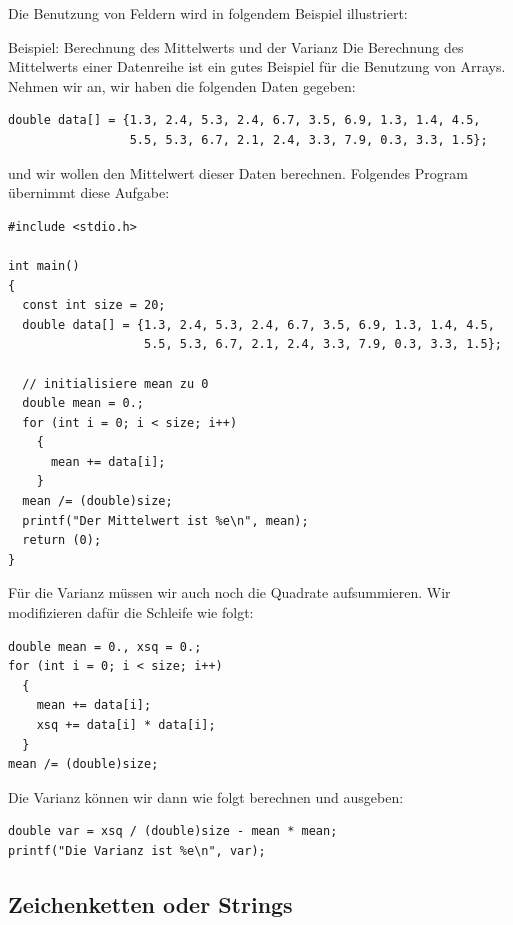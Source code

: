 Die Benutzung von Feldern wird in folgendem Beispiel illustriert:
\begin{myexampleprogram}{Beispiel: Berechnung des Mittelwerts und der Varianz}
  Die Berechnung des Mittelwerts einer Datenreihe ist ein gutes Beispiel für die Benutzung von Arrays.
  Nehmen wir an, wir haben die folgenden Daten gegeben:
\begin{lstlisting}
double data[] = {1.3, 2.4, 5.3, 2.4, 6.7, 3.5, 6.9, 1.3, 1.4, 4.5,
                 5.5, 5.3, 6.7, 2.1, 2.4, 3.3, 7.9, 0.3, 3.3, 1.5};
\end{lstlisting}
  und wir wollen den Mittelwert dieser Daten berechnen.
  Folgendes Program übernimmt diese Aufgabe:
\begin{lstlisting}
#include <stdio.h>

int main()
{
  const int size = 20;
  double data[] = {1.3, 2.4, 5.3, 2.4, 6.7, 3.5, 6.9, 1.3, 1.4, 4.5,
                   5.5, 5.3, 6.7, 2.1, 2.4, 3.3, 7.9, 0.3, 3.3, 1.5};

  // initialisiere mean zu 0
  double mean = 0.;
  for (int i = 0; i < size; i++)
    {
      mean += data[i];
    }
  mean /= (double)size;
  printf("Der Mittelwert ist %e\n", mean);
  return (0);
}
\end{lstlisting}
  Für die Varianz müssen wir auch noch die Quadrate aufsummieren.
  Wir modifizieren dafür die Schleife wie folgt:
\begin{lstlisting}
double mean = 0., xsq = 0.;
for (int i = 0; i < size; i++)
  {
    mean += data[i];
    xsq += data[i] * data[i];
  }
mean /= (double)size;
\end{lstlisting}
  Die Varianz können wir dann wie folgt berechnen und ausgeben:
\begin{lstlisting}
double var = xsq / (double)size - mean * mean;
printf("Die Varianz ist %e\n", var);
\end{lstlisting}
\end{myexampleprogram}
\newpage

\subsection{Zeichenketten oder Strings}

